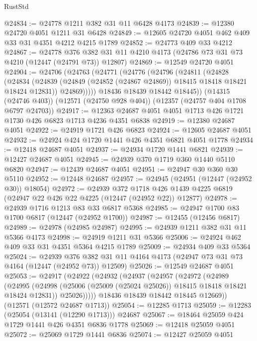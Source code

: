 \begin{lexlean}{RustStd}
\begin{coremodule}
@24834 := @24778 @1211 @382 @31 @11 @6428 @4173
@24839 := @12380 @24720 @4051 @1211 @31 @6428
@24849 := @12605 @24720 @4051 @462 @409 @33 @31 @4351 @4212 @4215 @1789
@24852 := @24773 @409 @33 @4212
@24867 := @24778
    @376
    @382
    @31
    @11
    @4210
    @4173
    (@24786 @73 @31 @73 @4210 (@12447 (@24791 @73)) @12807)
@24869 := @12549 @24720 @4051
@24904 := @24706
    (@24763
      (@24771
        (@24776
          (@24796
            (@24811
              (@24828
                (@24834
                  (@24839 (@24849 (@24852 (@24867 @24869)) @18415 @18418 @18421 @18424 @12831))
                  @24869)))))
        @18436
        @18439
        @18442
        @18445))
    (@14315 (@24746 @403))
    (@12571 (@24750 @928 @404))
    (@12357 (@24757 @404 @1708 @6797 @24703))
@24917 := @12363 @24687 @4051 @4051 @1713 @426 @1721 @1730 @426 @6823 @1713 @4236 @4351 @6838
@24919 := @12380 @24687 @4051
@24922 := @24919 @1721 @426 @6823
@24924 := @12605 @24687 @4051
@24932 := @24924 @424 @1720 @1441 @426 @4351 @6821 @4051 @1778
@24934 := @12418 @24687 @4051
@24937 := @24934 @1720 @1441 @6821
@24939 := @12427 @24687 @4051
@24945 := @24939 @370 @1719 @360 @1440 @5110 @6820
@24947 := @12439 @24687 @4051
@24951 := @24947 @30 @360 @30 @5110
@24952 := @12448 @24687
@24957 := @24945 (@24951 (@12447 (@24952 @30)) @18054)
@24972 := @24939
    @372
    @1718
    @426
    @1439
    @4225
    @6819
    (@24947 @22 @426 @22 @4225 (@12447 (@24952 @22)) @12877)
@24978 := @24939 @1716 @1213 @83 @33 @6817 @5368
@24985 := @24947 @1700 @83 @1700 @6817 (@12447 (@24952 @1700))
@24987 := @12455 (@12456 @6817)
@24989 := @24978 (@24985 @24987)
@24995 := @24939 @1211 @382 @31 @11 @5366 @4173
@24998 := @24919 @1211 @31 @5366
@25006 := @24924 @462 @409 @33 @31 @4351 @5364 @4215 @1789
@25009 := @24934 @409 @33 @5364
@25024 := @24939
    @376
    @382
    @31
    @11
    @4164
    @4173
    (@24947 @73 @31 @73 @4164 (@12447 (@24952 @73)) @12509)
@25026 := @12549 @24687 @4051
@25053 := @24917
    (@24922
      (@24932
        (@24937
          (@24957
            (@24972
              (@24989
                (@24995
                  (@24998 (@25006 (@25009 (@25024 @25026)) @18415 @18418 @18421 @18424 @12831))
                  @25026)))))
        @18436
        @18439
        @18442
        @18445
        @12669))
    (@12571 (@12572 @24687 @1713))
@25054 := @12285 @1713
@25059 := @12283 (@25054 (@13141 (@12290 @1713))) @24687
@25067 := @18464 @25059 @424 @1729 @1441 @426 @4351 @6836 @1778
@25069 := @12418 @25059 @4051
@25072 := @25069 @1729 @1441 @6836
@25074 := @12427 @25059 @4051

\end{coremodule}
\end{lexlean}
